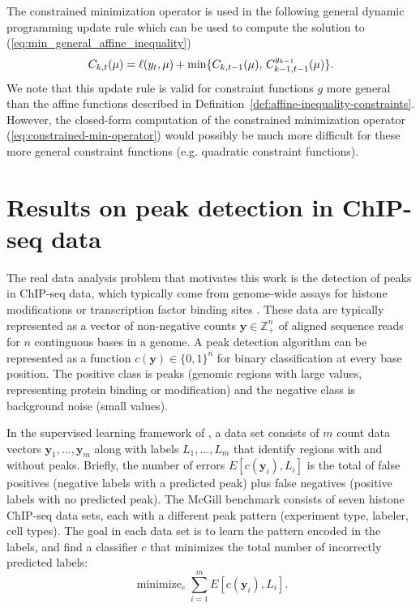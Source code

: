 \documentclass{article}
\DeclareMathOperator*{\minimize}{minimize}
\newcommand{\ZZ}{\mathbb Z}
\begin{document}
The constrained minimization operator is used in the following general
dynamic programming update rule which can be used to compute the
solution to (\ref{eq:min_general_affine_inequality})
\begin{equation}
  \label{eq:general_dp}
  C_{k,t}(\mu) = \ell(y_t,\mu) + \min\{
  C_{k,t-1}(\mu),\,
  C_{k-1,t-1}^{g_{k-1}}(\mu)
  \}.
\end{equation}
We note that this update rule is valid for constraint functions $g$
more general than the affine functions described in
Definition~\ref{def:affine-inequality-constraints}. However, the
closed-form computation of the constrained minimization operator
(\ref{eq:constrained-min-operator}) would possibly be much more
difficult for these more general constraint functions (e.g. quadratic
constraint functions).

\section{Results on peak detection in ChIP-seq data}
\label{sec:results-chip-seq}
\label{sec:results}

The real data analysis problem that motivates this work is the
detection of peaks in ChIP-seq data, which typically come from
genome-wide assays for histone modifications or transcription factor
binding sites \citep{practical}. These data are typically represented
as a vector of non-negative counts $\mathbf y\in\ZZ_+^n$ of aligned
sequence reads for $n$ continguous bases in a genome. A peak detection
algorithm can be represented as a function $c(\mathbf y)\in\{0,1\}^n$
for binary classification at every base position. The positive class
is peaks (genomic regions with large values, representing protein
binding or modification) and the negative class is background noise
(small values).

In the supervised learning framework of \citet{HOCKING2016-chipseq}, a
data set consists of $m$ count data vectors
$\mathbf y_1,\dots,\mathbf y_m$ along with labels $L_1,\dots, L_m$
that identify regions with and without peaks. Briefly, the number of
errors $E[c(\mathbf y_i), L_i]$ is the total of false positives
(negative labels with a predicted peak) plus false negatives (positive
labels with no predicted peak). The McGill benchmark consists of seven
histone ChIP-seq data sets, each with a different peak pattern
(experiment type, labeler, cell types). The goal in each data set is
to learn the pattern encoded in the labels, and find a classifier $c$
that minimizes the total number of incorrectly predicted labels:
\begin{equation}
  \label{eq:learn}
  \minimize_c
  \sum_{i=1}^m E\left[
    c(\mathbf y_i), L_i
  \right].
\end{equation}
\end{document}
